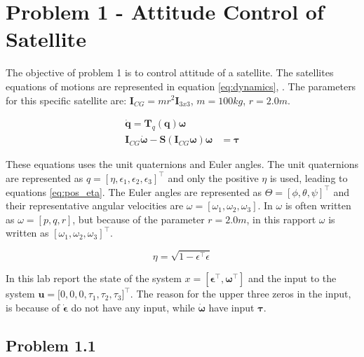 \section*{Problem 1 - Attitude Control of Satellite}

The objective of problem 1 is to control attitude of a satellite. The satellites equations of motions are represented in equation \eqref{eq:dynamics},  \cite{Fossen2011}. The parameters for this specific satellite are: $\mathbf{I}_{CG} = mr^2 \mathbf{I}_{3x3}$, $m = 100 kg$, $r = 2.0 m$.  

\begin{subequations}
\label{eq:dynamics}
	\begin{align}
		\dot{\mathbf{q}} = \mathbf{T}_q (\mathbf{q} ) \boldsymbol{\omega} \\
		\mathbf{I}_{CG} \dot{\boldsymbol{\omega}} - \mathbf{S} (\mathbf{I}_{CG} \boldsymbol{\omega} ) \boldsymbol{\omega} & =  \boldsymbol{\tau} 
		\label{eq:EOM_omega_dot}
	\end{align}	
\end{subequations}

These equations uses the unit quaternions and Euler angles. The unit  quaternions are represented as $q = [\eta, \epsilon_1, \epsilon_2, \epsilon_3]^\top$ and only the positive $\eta$ is used, leading to equations \eqref{eq:pos_eta}. The Euler angles are represented as $\Theta = [\phi , \theta , \psi]^\top$ and their representative angular velocities are  $\omega = [\omega_1, \omega_2, \omega_3]$. In \cite{Fossen2011} $\omega$ is often written as $\omega = [p,q,r]$, but because of the parameter $r = 2.0m$, in this rapport $\omega$ is written as $[\omega_1, \omega_2, \omega_3]^\top$.

\begin{equation}
    \eta = \sqrt{1 - \epsilon^\top \epsilon} 
    \label{eq:pos_eta}
\end{equation}
 
In this lab report the state of the system $x = [ \boldsymbol{\epsilon}^\top, \boldsymbol{\omega}^\top]$ and the input to the system $\mathbf{u} = \boldsymbol[0,0,0,\tau_1, \tau_2, \tau_3]^\top$. The reason for the upper three zeros in the input, is because of $\dot{\boldsymbol{\epsilon}}$ do not have any input, while $\dot{\boldsymbol{\omega}}$ have input $\boldsymbol{\tau}$.

\subsection*{Problem 1.1}

